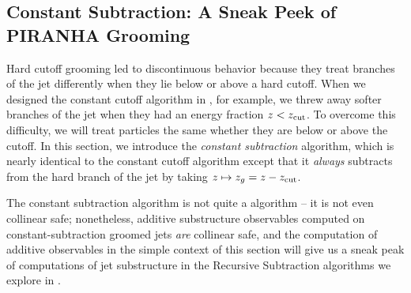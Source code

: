 


\subsection[Constant Subtraction: A Sneak Peek of \textsc{Piranha} Grooming]{Constant Subtraction: A Sneak Peek of PIRANHA Grooming}
\label{sec:constant-subtraction}


Hard cutoff grooming led to discontinuous behavior because they treat branches of the jet differently when they lie below or above a hard cutoff.
%
When we designed the constant cutoff algorithm in , for example, we threw away softer branches of the jet when they had an energy fraction \(z < z_{\rm cut}\).
%
To overcome this difficulty, we will treat particles the same whether they are below or above the cutoff.
%
In this section, we introduce the \emph{constant subtraction} algorithm, which is nearly identical to the constant cutoff algorithm except that it \textit{always} subtracts from the hard branch of the jet by taking \(z \mapsto z_g = z - z_{\rm cut}\).

The constant subtraction algorithm is not quite a \PIRANHA{} algorithm -- it is not even collinear safe;
%
nonetheless, additive substructure observables computed on constant-subtraction groomed jets \textit{are} collinear safe, and the computation of additive observables in the simple context of this section will give us a sneak peak of computations of jet substructure in the Recursive Subtraction algorithms we explore in .

